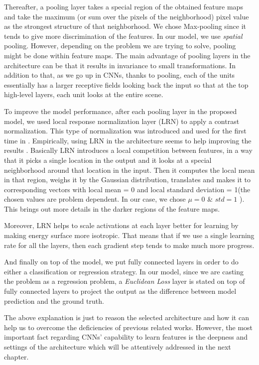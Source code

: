 \indent Thereafter, a pooling layer takes a special region of the obtained feature maps and take the maximum (or sum over the pixels of the neighborhood) pixel value as the strongest structure of that neighborhood. We chose Max-pooling since it tends to give more discrimination of the features\cite{boureau2010theoretical}. In our model, we use \textit{spatial} pooling. However, depending on the problem we are trying to solve, pooling might be done within feature maps\cite{goodfellow2013maxout}.  The main advantage of pooling layers in the architecture can be that it results in invariance to small transformations. In addition to that, as we go up in CNNs, thanks to pooling, each of the units essentially has a larger receptive fields looking back the input so that at the top high-level layers, each unit looks at the entire scene.  

To improve the model performance, after each pooling layer in the proposed model, we used local response normalization layer (LRN) to apply a contrast normalization. This type of normalization was introduced and used for the first time in \cite{krizhevsky2012imagenet}. Empirically, using LRN in the architecture seems to help improving the results \cite{jarrett2009best, krizhevsky2012imagenet}. Basically LRN introduces a local competition between features, in a way that it picks a single location in the output and it looks at a special neighborhood around that location in the input. Then it computes the local mean in that region, weighs it by the Gaussian distribution, translates and makes it to corresponding vectors with local mean = 0 and local standard deviation = 1(the chosen values are problem dependent. In our case, we chose $\mu = 0$ \& $std = 1 $ ). This brings out more details in the darker regions of the feature maps. 

\indent Moreover, LRN helps to scale activations at each layer better for learning by making energy surface more isotropic. That means that if we use a single learning rate for all the layers, then each gradient step tends to make much more progress\cite{jarrett2009best}. 

And finally on top of the model, we put fully connected layers in order to do either a classification or regression strategy. In our model, since we are casting the problem as a regression problem, a \textit{Euclidean Loss} layer is stated on top of fully connected layers to project the output as the difference between model prediction and the ground truth. 

The above explanation is just to reason the selected architecture and how it can help us to overcome the deficiencies of previous related works. However, the most important fact regarding CNNs' capability to learn features is the deepness and settings of the architecture which will be attentively addressed in the next chapter.  

